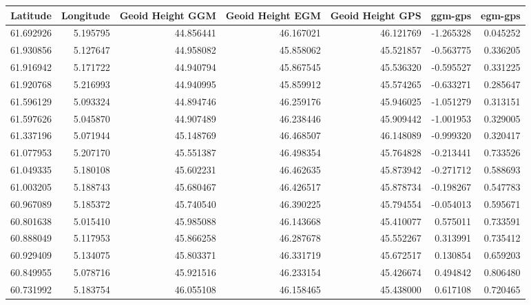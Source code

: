 \begin{tabular}{rrrrrrr}
\toprule
  Latitude &  Longitude &  Geoid Height GGM &  Geoid Height EGM &  Geoid Height GPS &   ggm-gps &   egm-gps \\
\midrule
 61.692926 &   5.195795 &         44.856441 &         46.167021 &         46.121769 & -1.265328 &  0.045252 \\
 61.930856 &   5.127647 &         44.958082 &         45.858062 &         45.521857 & -0.563775 &  0.336205 \\
 61.916942 &   5.171722 &         44.940794 &         45.867545 &         45.536320 & -0.595527 &  0.331225 \\
 61.920768 &   5.216993 &         44.940995 &         45.859912 &         45.574265 & -0.633271 &  0.285647 \\
 61.596129 &   5.093324 &         44.894746 &         46.259176 &         45.946025 & -1.051279 &  0.313151 \\
 61.597626 &   5.045870 &         44.907489 &         46.238446 &         45.909442 & -1.001953 &  0.329005 \\
 61.337196 &   5.071944 &         45.148769 &         46.468507 &         46.148089 & -0.999320 &  0.320417 \\
 61.077953 &   5.207170 &         45.551387 &         46.498354 &         45.764828 & -0.213441 &  0.733526 \\
 61.049335 &   5.180108 &         45.602231 &         46.462635 &         45.873942 & -0.271712 &  0.588693 \\
 61.003205 &   5.188743 &         45.680467 &         46.426517 &         45.878734 & -0.198267 &  0.547783 \\
 60.967089 &   5.185372 &         45.740540 &         46.390225 &         45.794554 & -0.054013 &  0.595671 \\
 60.801638 &   5.015410 &         45.985088 &         46.143668 &         45.410077 &  0.575011 &  0.733591 \\
 60.888049 &   5.117953 &         45.866258 &         46.287678 &         45.552267 &  0.313991 &  0.735412 \\
 60.929409 &   5.134075 &         45.803371 &         46.331719 &         45.672517 &  0.130854 &  0.659203 \\
 60.849955 &   5.078716 &         45.921516 &         46.233154 &         45.426674 &  0.494842 &  0.806480 \\
 60.731992 &   5.183754 &         46.055108 &         46.158465 &         45.438000 &  0.617108 &  0.720465 \\

\end{tabular}
